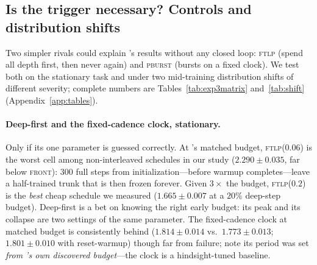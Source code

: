 \subsection{Is the trigger necessary? Controls and distribution shifts}
\label{sec:controls}

Two simpler rivals could explain \fw{}'s results without any closed loop:
\textsc{ftlp} (spend all depth first, then never again) and \textsc{pburst}
(bursts on a fixed clock). We test both on the stationary task and under
two mid-training distribution shifts of different severity; complete
numbers are Tables~\ref{tab:exp3matrix} and~\ref{tab:shift}
(Appendix~\ref{app:tables}).

\paragraph{Deep-first and the fixed-cadence clock, stationary.} Only if
its one parameter is guessed correctly. At \fw{}'s matched budget,
\textsc{ftlp}($0.06$) is the worst cell among non-interleaved schedules
in our study ($2.290 \pm 0.035$, far below \textsc{front}): $300$ full steps from initialization---before
warmup completes---leave a half-trained trunk that is then frozen forever.
Given $3\times$ the budget, \textsc{ftlp}($0.2$) is the \emph{best} cheap
schedule we measured ($1.665 \pm 0.007$ at a $20\%$ deep-step budget).
Deep-first is a bet on knowing the right early budget: its peak and its
collapse are two settings of the same parameter. The fixed-cadence clock at
matched budget is consistently behind \fw{} ($1.814 \pm 0.014$ vs.\
$1.773 \pm 0.013$; $1.801 \pm 0.010$ with reset-warmup) though far from
failure; note its period was set \emph{from \fw{}'s own discovered
budget}---the clock is a hindsight-tuned baseline.

